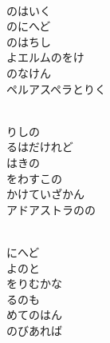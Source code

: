 \documentclass[10pt,b5j]{tarticle} %
\begin{document}
\vspace{1.5em} %
\newcommand{\linespace}{0.5em} %
\newcommand{\blocksize}{0.5\hsize} %
\newcommand{\itemmargin}{3em} %
\begin{enumerate} %
    \setlength{\itemindent}{\itemmargin} %
    \begin{minipage}[c]{\blocksize}
    
        \vspace{\linespace}
        \item~\\
        のはいく\\
        のにへど\\
        のはちし\\
        よエルムのをけ\\
        のなけん\\
        ペルアスペラとりく
        
    \end{minipage}
    \begin{minipage}[c]{\blocksize}
        
        \vspace{\linespace}
        \item~\\
        りしの\\
        るはだけれど\\
        はきの\\
        をわすこの\\
        かけていざかん\\
        アドアストラのの
        
    \end{minipage}
    \begin{minipage}[c]{\blocksize}
        
        \vspace{\linespace}
        \item~\\
        にへど\\
        よのと\\
        をりむかな\\
        るのも\\
        めてのはん\\
        のびあれば
        

\end{minipage}
\end{enumerate}
\end{document}
